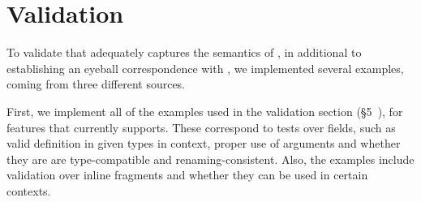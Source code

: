 \section{Validation}\label{sec:valid}


To validate that \gcoql adequately captures the semantics of \gql, in additional to establishing an eyeball correspondence with \spec, 
we implemented several examples, coming from three different sources.

First, we implement all of the examples used in the \spec validation section (\cf\S5~\cite{gqlspec}), for features that \gcoql currently supports.
These correspond to tests over fields, such as valid definition in given types in context, proper use of arguments and 
whether they are are type-compatible and renaming-consistent. Also, the examples include validation over inline fragments and 
whether they can be used in certain contexts. 




